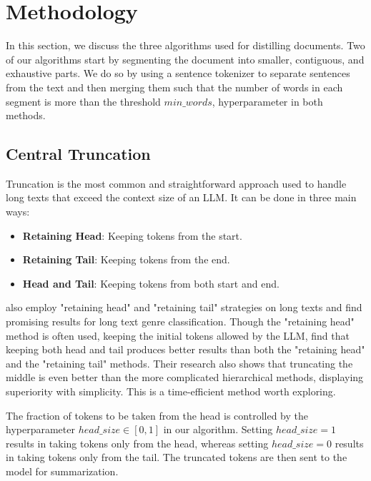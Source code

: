 \section{Methodology}
\label{sec:methodology}

In this section, we discuss the three algorithms used for distilling documents.
Two of our algorithms start by segmenting the document into smaller, contiguous, and exhaustive parts.
We do so by using a sentence tokenizer to separate sentences from the text and then merging them such that the number of words in each segment is more than the threshold $min\_words$, hyperparameter in both methods.


\subsection{Central Truncation}
\label{method:truncation}

Truncation is the most common and straightforward approach used to handle long texts that exceed the context size of an LLM.
It can be done in three main ways:

\begin{itemize}
  \item \textbf{Retaining Head}: Keeping tokens from the start.
  \item \textbf{Retaining Tail}: Keeping tokens from the end.
  \item \textbf{Head and Tail}: Keeping tokens from both start and end.
\end{itemize}

\citet{worsham-kalita-2018-genre} also employ "retaining head" and "retaining tail" strategies on long texts and find promising results for long text genre classification.
Though the "retaining head" method is often used, keeping the initial tokens allowed by the LLM, \citet{sun2019fine} find that keeping both head and tail produces better results than both the "retaining head" and the "retaining tail" methods.
Their research also shows that truncating the middle is even better than the more complicated hierarchical methods, displaying superiority with simplicity.
This is a time-efficient method worth exploring.

The fraction of tokens to be taken from the head is controlled by the hyperparameter $head\_size \in [0, 1]$ in our algorithm.
Setting $head\_size = 1$ results in taking tokens only from the head, whereas setting $head\_size = 0$ results in taking tokens only from the tail.
The truncated tokens are then sent to the model for summarization.


